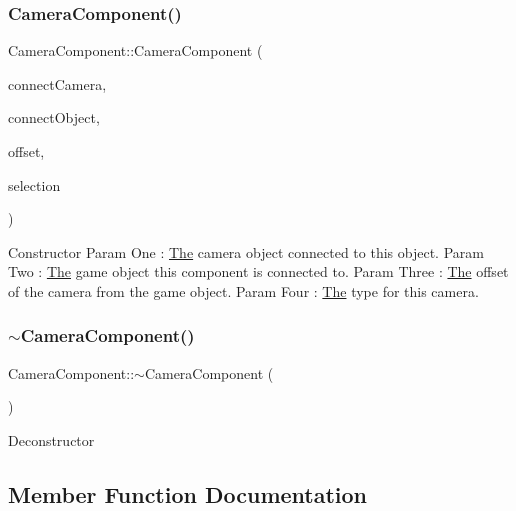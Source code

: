 \subsubsection{\texorpdfstring{Camera\+Component()}{CameraComponent()}\hspace{0.1cm}{\footnotesize\ttfamily [4/4]}}
{\footnotesize\ttfamily Camera\+Component\+::\+Camera\+Component (\begin{DoxyParamCaption}\item[{\mbox{\hyperlink{class_camera}{Camera}} $\ast$}]{connect\+Camera,  }\item[{\mbox{\hyperlink{class_game_object}{Game\+Object}} $\ast$}]{connect\+Object,  }\item[{glm\+::vec3}]{offset,  }\item[{\mbox{\hyperlink{_camera_component_8h_ab07ecb557631c59d8b7ec9c3db110dd5}{camera\+Type}}}]{selection }\end{DoxyParamCaption})\hspace{0.3cm}{\ttfamily [inline]}}

Constructor Param One \+: \mbox{\hyperlink{class_the}{The}} camera object connected to this object. Param Two \+: \mbox{\hyperlink{class_the}{The}} game object this component is connected to. Param Three \+: \mbox{\hyperlink{class_the}{The}} offset of the camera from the game object. Param Four \+: \mbox{\hyperlink{class_the}{The}} type for this camera. \mbox{\label{class_camera_component_a977e080c45152719c5e6335cfb0698fc}} 
\subsubsection{\texorpdfstring{$\sim$\+Camera\+Component()}{~CameraComponent()}}
{\footnotesize\ttfamily Camera\+Component\+::$\sim$\+Camera\+Component (\begin{DoxyParamCaption}{ }\end{DoxyParamCaption})\hspace{0.3cm}{\ttfamily [inline]}}

Deconstructor 

\subsection{Member Function Documentation}
\mbox{\label{class_camera_component_a1fbb5ea1f011ec8ea75688566c8bb545}} 
